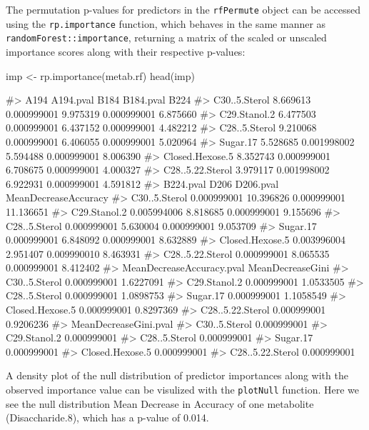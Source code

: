 The permutation p-values for predictors in the \texttt{rfPermute} object
can be accessed using the \texttt{rp.importance} function, which behaves
in the same manner as \texttt{randomForest::importance}, returning a
matrix of the scaled or unscaled importance scores along with their
respective p-values:

\begin{Schunk}
\begin{Sinput}
imp <- rp.importance(metab.rf)
head(imp)
\end{Sinput}
\begin{Soutput}
#>                      A194   A194.pval     B184   B184.pval     B224
#> C30..5.Sterol    8.669613 0.000999001 9.975319 0.000999001 6.875660
#> C29.Stanol.2     6.477503 0.000999001 6.437152 0.000999001 4.482212
#> C28..5.Sterol    9.210068 0.000999001 6.406055 0.000999001 5.020964
#> Sugar.17         5.528685 0.001998002 5.594488 0.000999001 8.006390
#> Closed.Hexose.5  8.352743 0.000999001 6.708675 0.000999001 4.000327
#> C28..5.22.Sterol 3.979117 0.001998002 6.922931 0.000999001 4.591812
#>                    B224.pval      D206   D206.pval MeanDecreaseAccuracy
#> C30..5.Sterol    0.000999001 10.396826 0.000999001            11.136651
#> C29.Stanol.2     0.005994006  8.818685 0.000999001             9.155696
#> C28..5.Sterol    0.000999001  5.630004 0.000999001             9.053709
#> Sugar.17         0.000999001  6.848092 0.000999001             8.632889
#> Closed.Hexose.5  0.003996004  2.951407 0.009990010             8.463931
#> C28..5.22.Sterol 0.000999001  8.065535 0.000999001             8.412402
#>                  MeanDecreaseAccuracy.pval MeanDecreaseGini
#> C30..5.Sterol                  0.000999001        1.6227091
#> C29.Stanol.2                   0.000999001        1.0533505
#> C28..5.Sterol                  0.000999001        1.0898753
#> Sugar.17                       0.000999001        1.1058549
#> Closed.Hexose.5                0.000999001        0.8297369
#> C28..5.22.Sterol               0.000999001        0.9206236
#>                  MeanDecreaseGini.pval
#> C30..5.Sterol              0.000999001
#> C29.Stanol.2               0.000999001
#> C28..5.Sterol              0.000999001
#> Sugar.17                   0.000999001
#> Closed.Hexose.5            0.000999001
#> C28..5.22.Sterol           0.000999001
\end{Soutput}
\end{Schunk}

A density plot of the null distribution of predictor importances along
with the observed importance value can be visulized with the
\texttt{plotNull} function. Here we see the null distribution Mean
Decrease in Accuracy of one metabolite (Disaccharide.8), which has a
p-value of 0.014.

